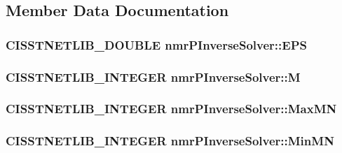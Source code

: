\subsection{Member Data Documentation}
\hypertarget{classnmr_p_inverse_solver_a7f262c9d12cdc03828834a3adacf1f52}{
\subsubsection[{E\-P\-S}]{\setlength{\rightskip}{0pt plus 5cm}C\-I\-S\-S\-T\-N\-E\-T\-L\-I\-B\-\_\-\-D\-O\-U\-B\-L\-E nmr\-P\-Inverse\-Solver\-::\-E\-P\-S\hspace{0.3cm}{\ttfamily [protected]}}}\label{classnmr_p_inverse_solver_a7f262c9d12cdc03828834a3adacf1f52}
\hypertarget{classnmr_p_inverse_solver_a7e98835c5d1cf8493784b3789aa49c23}{
\subsubsection[{M}]{\setlength{\rightskip}{0pt plus 5cm}C\-I\-S\-S\-T\-N\-E\-T\-L\-I\-B\-\_\-\-I\-N\-T\-E\-G\-E\-R nmr\-P\-Inverse\-Solver\-::\-M\hspace{0.3cm}{\ttfamily [protected]}}}\label{classnmr_p_inverse_solver_a7e98835c5d1cf8493784b3789aa49c23}
\hypertarget{classnmr_p_inverse_solver_aafd3d099ed0e477769c41645744c3acd}{
\subsubsection[{Max\-M\-N}]{\setlength{\rightskip}{0pt plus 5cm}C\-I\-S\-S\-T\-N\-E\-T\-L\-I\-B\-\_\-\-I\-N\-T\-E\-G\-E\-R nmr\-P\-Inverse\-Solver\-::\-Max\-M\-N\hspace{0.3cm}{\ttfamily [protected]}}}\label{classnmr_p_inverse_solver_aafd3d099ed0e477769c41645744c3acd}
\hypertarget{classnmr_p_inverse_solver_a28485b3520282846c1b0e6f1137da9b2}{
\subsubsection[{Min\-M\-N}]{\setlength{\rightskip}{0pt plus 5cm}C\-I\-S\-S\-T\-N\-E\-T\-L\-I\-B\-\_\-\-I\-N\-T\-E\-G\-E\-R nmr\-P\-Inverse\-Solver\-::\-Min\-M\-N\hspace{0.3cm}{\ttfamily [protected]}}}\label{classnmr_p_inverse_solver_a28485b3520282846c1b0e6f1137da9b2}
